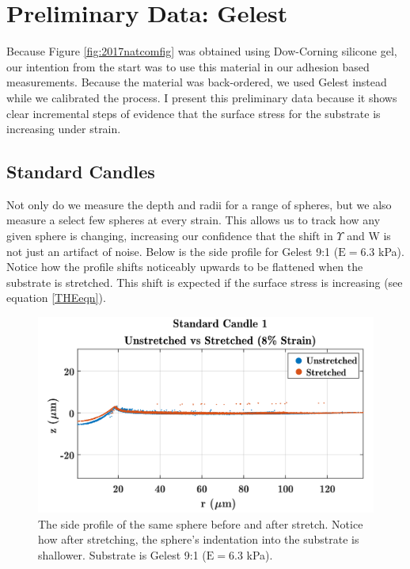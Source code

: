 \section{Preliminary Data: Gelest}
Because Figure \ref{fig:2017natcomfig} was obtained using Dow-Corning silicone gel, our intention from the start was to use this material in our adhesion based measurements. Because the material was back-ordered, we used Gelest instead while we calibrated the process. I present this preliminary data because it shows clear incremental steps of evidence that the surface stress for the substrate is increasing under strain.  

\subsection{Standard Candles}
Not only do we measure the depth and radii for a range of spheres, but we also measure a select few spheres at every strain. This allows us to track how any given sphere is changing, increasing our confidence that the shift in $\Upsilon$ and W is not just an artifact of noise. Below is the side profile for Gelest 9:1 ($\text{E}=6.3$ kPa). Notice how the profile shifts noticeably upwards to be flattened when the substrate is stretched. This shift is expected if the surface stress is increasing (see equation \ref{THEeqn}).

\begin{figure}[h!]
	\centering
	\includegraphics[width=\linewidth]{Chapters/Figures/sc1_unstretched_v_8ml}
	\caption[Side Collapse Comparison]{The side profile of the same sphere before and after stretch. Notice how after stretching, the sphere's indentation into the substrate is shallower. Substrate is Gelest 9:1 ($\text{E}=6.3$ kPa).}	
	\label{fig:sc1unstretchedv8ml}
\end{figure}

